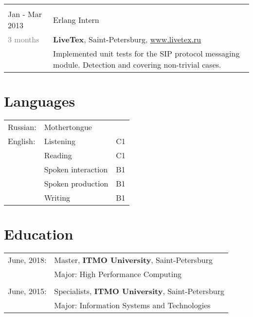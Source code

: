 \documentclass[a4paper,10pt]{article}
\begin{document}
\begin{tabularx}{\textwidth}{lX}
	\multicolumn{2}{c}{}\\

	Jan - Mar 2013			&	Erlang Intern \\
	\textcolor{gray}
	{3 months}
							&	\textbf{LiveTex}, Saint-Petersburg,
								\href{www.livetex.ru}{www.livetex.ru} \\
							& 	\footnotesize{
									Implemented unit tests for the SIP protocol messaging module. Detection and covering non-trivial cases.
								} \\
\end{tabularx}


\section{Languages}
\begin{tabular}{ll|l}
	Russian:				& \multicolumn{2}{l}{Mothertongue} \\
	English\footnotemark :	& Listening				& C1 \\
							& Reading				& C1 \\
							& Spoken interaction	& B1 \\
							& Spoken production		& B1 \\
							& Writing				& B1 \\
	
\end{tabular}


\section{Education}
\begin{tabularx}{\textwidth}{lX}
	June, 2018:		& Master, \textbf{ITMO University}, Saint-Petersburg \\
					& Major:  High Performance Computing \\

	\multicolumn{2}{c}{}\\

	June, 2015:		& Specialists, \textbf{ITMO University}, Saint-Petersburg \\
					& Major:  Information Systems and Technologies
\end{tabularx}


\end{document}
